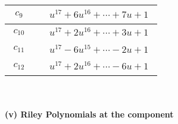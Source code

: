 \documentclass[1p]{elsarticle_modified}
\theoremstyle{definition}
\begin{document}
\begin{tabular}{m{50pt}|m{274pt}}
\hline $$\begin{aligned}c_{9}\end{aligned}$$&$\begin{aligned}
&u^{17}+6 u^{16}+\cdots+7 u+1
\end{aligned}$\\
\hline $$\begin{aligned}c_{10}\end{aligned}$$&$\begin{aligned}
&u^{17}+2 u^{16}+\cdots+3 u+1
\end{aligned}$\\
\hline $$\begin{aligned}c_{11}\end{aligned}$$&$\begin{aligned}
&u^{17}-6 u^{15}+\cdots-2 u+1
\end{aligned}$\\
\hline $$\begin{aligned}c_{12}\end{aligned}$$&$\begin{aligned}
&u^{17}+2 u^{16}+\cdots-6 u+1
\end{aligned}$\\
\hline
\end{tabular}\\~\\
\newpage\renewcommand{\arraystretch}{1}
\flushleft \textbf{(v) Riley Polynomials at the component}\newline \\
\end{document}
